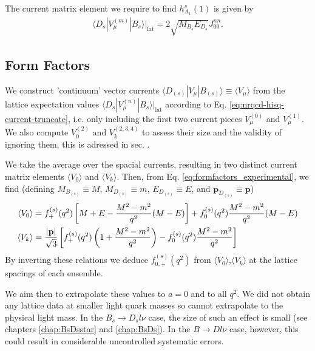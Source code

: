 The current matrix element we require to find $h_{A_1}^s(1)$ is given by
\begin{align}
  \langle D_s | V_{\mu}^{(m)} | B_s \rangle |_{\text{lat}} = 2 \sqrt{M_{B_s}E_{D_s}} J^{nn}_{00}.
  \label{eq:currentfit}
\end{align}

\subsection{Form Factors}

We construct 'continuum' vector currents $\langle D_{(s)}| V_{\mu} | B_{(s)} \rangle \equiv \langle V_{\mu} \rangle$ from the lattice expectation values $\langle D_s | V_{\mu}^{(n)} | B_s \rangle |_{\text{lat}}$ according to Eq. \eqref{eq:nrqcd-hisq-current-truncate}, i.e. only including the first two current pieces $V^{(0)}_{\mu}$ and $V^{(1)}_{\mu}$. We also compute $V^{(2)}_{0}$ and $V^{(2,3,4)}_k$ to assess their size and the validity of ignoring them, this is adressed in sec. {\red{!!!}}.

We take the average over the spacial currents, resulting in two distinct current matrix elements $\langle V_0 \rangle$ and $\langle V_k \rangle$. Then, from Eq. \eqref{eq:formfactors_experimental}, we find (defining $M_{B_{(s)}}\equiv M$, $M_{D_{(s)}}\equiv m$, $E_{D_{(s)}}\equiv E$, and ${\textbf{p}}_{D_{(s)}} \equiv {\textbf{p}}$)
\begin{align}
  \langle V_0 \rangle &= f^{(s)}_+(q^2) \left[ M + E - {M^2-m^2\over q^2}(M-E) \right] + f^{(s)}_0(q^2) {M^2-m^2\over q^2}(M-E) \\
  \langle V_k \rangle &= {|{\textbf{p}}|\over \sqrt{3}} \left[ f^{(s)}_+(q^2) \left( 1 + {M^2-m^2\over q^2} \right) - f^{(s)}_0(q^2) {M^2-m^2\over q^2} \right]
\end{align}
By inverting these relations we deduce $f^{(s)}_{0,+}(q^2)$ from $\langle V_0 \rangle$,$\langle V_k \rangle$ at the lattice spacings of each ensemble.

We aim then to extrapolate these values to $a=0$ and to all $q^2$. We did not obtain any lattice data at smaller light quark masses so cannot extrapolate to the physical light mass. In the $B_s\to D_sl\nu$ case, the size of such an effect is small (see chapters \ref{chap:BsDsstar} and \ref{chap:BsDs}). In the $B\to Dl\nu$ case, however, this could result in considerable uncontrolled systematic errors.

